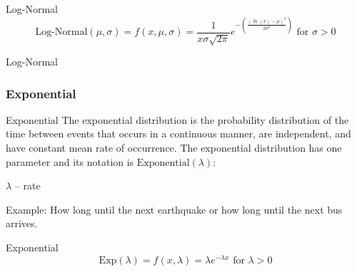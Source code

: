 \begin{frame}[noframenumbering]{Log-Normal}
	$$\text{Log-Normal}(\mu,\sigma) = f(x, \mu, \sigma) = \frac{1}{x \sigma{\sqrt{2\pi}}}e^{-\left({\frac {(\ln(x)-\mu)^2}{2 \sigma^2 }}\right)} \text{ for $\sigma > 0$}$$
\end{frame}

\begin{frame}[noframenumbering]{Log-Normal}
	\centering
\end{frame}

\subsubsection*{Exponential}
\begin{frame}[noframenumbering]{Exponential}
	The exponential distribution is the probability distribution of the time
	between events that occurs in a continuous manner, are independent,
	and have constant mean rate of occurrence.
	\vfill
	The exponential distribution has one parameter and its notation is
	$\text{Exponential}(\lambda)$:
	\begin{vfilleditems}
		\item $\lambda$ -- rate
	\end{vfilleditems}
	\vfill
	Example: How long until the next earthquake or how long until the next bus arrives.
\end{frame}

\begin{frame}[noframenumbering]{Exponential}
	$$\text{Exp}(\lambda) = f(x, \lambda) = \lambda e^{-\lambda x} \text{ for $\lambda > 0$}$$
\end{frame}

